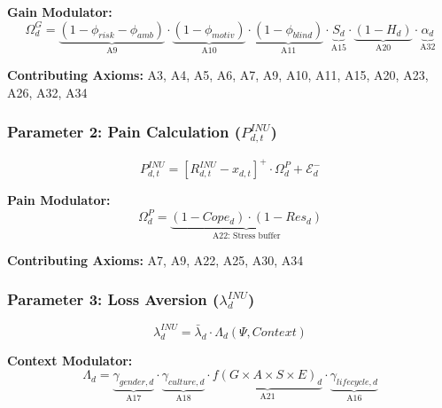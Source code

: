 \textbf{Gain Modulator:}
\begin{equation}
\Omega^G_d = \underbrace{(1 - \phi_{risk} - \phi_{amb})}_{\text{A9}} \cdot 
             \underbrace{(1 - \phi_{motiv})}_{\text{A10}} \cdot 
             \underbrace{(1 - \phi_{blind})}_{\text{A11}} \cdot 
             \underbrace{S_d}_{\text{A15}} \cdot 
             \underbrace{(1 - H_d)}_{\text{A20}} \cdot 
             \underbrace{\alpha_d}_{\text{A32}}
\end{equation}

\textbf{Contributing Axioms:} A3, A4, A5, A6, A7, A9, A10, A11, A15, A20, A23, A26, A32, A34

\subsubsection{Parameter 2: Pain Calculation ($P^{INU}_{d,t}$)}

\begin{tcolorbox}[colback=blue!5!white, colframe=blue!50!black]
\begin{equation}
\boxed{
P^{INU}_{d,t} = \left[ R^{INU}_{d,t} - x_{d,t} \right]^{+} \cdot \Omega^P_d + \mathcal{E}^{-}_d
}
\end{equation}
\end{tcolorbox}

\textbf{Pain Modulator:}
\begin{equation}
\Omega^P_d = \underbrace{(1 - Cope_d) \cdot (1 - Res_d)}_{\text{A22: Stress buffer}}
\end{equation}

\textbf{Contributing Axioms:} A7, A9, A22, A25, A30, A34

\subsubsection{Parameter 3: Loss Aversion ($\lambda^{INU}_{d}$)}

\begin{tcolorbox}[colback=blue!5!white, colframe=blue!50!black]
\begin{equation}
\boxed{
\lambda^{INU}_{d} = \bar{\lambda}_d \cdot \Lambda_d(\Psi, Context)
}
\end{equation}
\end{tcolorbox}

\textbf{Context Modulator:}
\begin{equation}
\Lambda_d = \underbrace{\gamma_{gender,d}}_{\text{A17}} \cdot 
            \underbrace{\gamma_{culture,d}}_{\text{A18}} \cdot 
            \underbrace{f(G \times A \times S \times E)_d}_{\text{A21}} \cdot
            \underbrace{\gamma_{lifecycle,d}}_{\text{A16}}
\end{equation}

